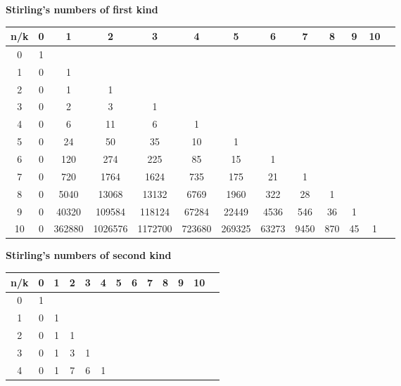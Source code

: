 {  \textbf{Stirling's numbers of first kind}
  \begin{center}
    \begin{tabular} {|c|c|c|c|c|c|c|c|c|c|c|c|c|}
      \hline
       n/k & 0 & 1 & 2 & 3 & 4 & 5 & 6 & 7 & 8 & 9 & 10 \\
       \hline
        0  & 1 &   &   &   &  &   &   &   &    &   &   \\
       \hline
        1  & 0 & 1  &   &   &  &   &   &   &    &   &   \\
       \hline
        2  & 0 & 1  & 1 &   &  &   &   &   &    &   &   \\
       \hline
        3  & 0 & 2  & 3 & 1 &  &   &   &   &    &   &   \\
       \hline
        4  & 0 & 6  & 11 & 6 & 1 &   &   &   &    &   &   \\
       \hline
        5  & 0 & 24  & 50 & 35 & 10 &  1 &   &   &    &   &   \\
       \hline
        6  & 0 & 120  & 274 & 225 & 85 &  15 & 1  &   &    &   &   \\
       \hline
        7  & 0 & 720  & 1764 & 1624 & 735 &  175 & 21  & 1 &    &   &   \\
       \hline
        8  & 0 & 5040  & 13068 & 13132 & 6769 &  1960 & 322  & 28 & 1  &   &   \\
       \hline
        9  & 0 & 40320  & 109584 & 118124 & 67284 &  22449 & 4536  & 546 & 36  &
        1&   \\
       \hline
        10  & 0 & 362880  & 1026576 & 1172700 & 723680 &  269325 & 63273  & 9450
            & 870  & 45 &  1 \\
        \hline
    \end{tabular}
  \end{center}
  \textbf{Stirling's numbers of second kind}
  \begin{center}
    \begin{tabular} {|c|c|c|c|c|c|c|c|c|c|c|c|c|}
      \hline
       n/k & 0 & 1 & 2 & 3 & 4 & 5 & 6 & 7 & 8 & 9 & 10 \\
       \hline
        0  & 1 &   &   &   &  &   &   &   &    &   &   \\
       \hline
        1  & 0 & 1  &   &   &  &   &   &   &    &   &   \\
       \hline
        2  & 0 & 1  & 1 &   &  &   &   &   &    &   &   \\
       \hline
        3  & 0 & 1  & 3 & 1 &  &   &   &   &    &   &   \\
       \hline
        4  & 0 & 1  & 7 & 6 & 1 &   &   &   &    &   &   \\

\end{tabular}
\end{center}}
